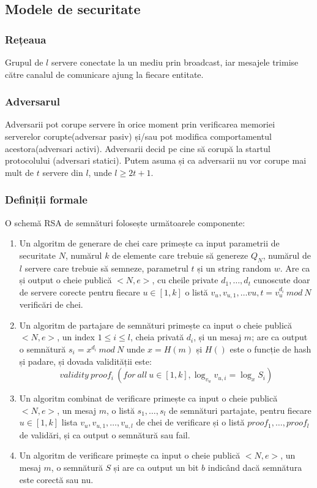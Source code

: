 \documentclass[12pt, oneside]{book}
\begin{document}
\subsection{Modele de securitate}
\subsubsection{Rețeaua}
Grupul de $l$ servere conectate la un mediu prin broadcast, iar mesajele trimise către canalul de comunicare ajung la fiecare entitate.
\subsubsection{Adversarul}
Adversarii pot corupe servere în orice moment prin verificarea memoriei serverelor corupte(adversar pasiv) și/sau pot modifica comportamentul acestora(adversari activi). Adversarii decid pe cine să corupă la startul protocolului (adversari statici). Putem asuma și ca adversarii nu vor corupe mai mult de $t$ servere din $l$, unde $l \geqslant 2t+1$.
\subsubsection{Definiții formale}
O schemă RSA de semnături folosește următoarele componente:
\begin{enumerate}
\item Un algoritm de generare de chei care primește ca input parametrii de securitate $N$, numărul $k$ de elemente care trebuie să genereze $Q_N$, numărul de $l$ servere care trebuie să semneze, parametrul $t$ și un string random $w$. Are ca și output o cheie publică $<N,e>$, cu cheile private $d_1, \dots ,d_t$ cunoscute doar de servere corecte pentru fiecare $u \in [1,k]$ o listă $v_u,v_{u,1}, \dots v{u,t}=v_{u}^{d_i} \ mod \ N$ verificări de chei. 
\item Un algoritm de partajare de semnături primește ca input o cheie publică $<N,e>$, un index $ 1\leq i \leq l$, cheia privată $d_i$, și un mesaj $m$; are ca output o semnătură $s_i = x^{d_i} \ mod \ N$ unde $x=H(m)$ și $H()$ este o funcție de hash și padare, și dovada validității este:
$$ validity \ proof_i \ (for \ all \ u \in [1,k], \log_{v_u} v_{u,i}=\log_x S_i)$$
\item Un algoritm combinat de verificare primește ca input o cheie publică $<N,e>$, un mesaj $m$, o listă $s_1, \dots ,s_l$ de semnături partajate, pentru fiecare $u \in [1,k]$ lista $v_u,v_{u,1}, \dots ,v_{u,l}$ de chei de verificare și o listă $proof_1, \dots ,proof_l$ de validări, și ca output o semnătură sau fail.
\item Un algoritm de verificare primește ca input o cheie publică $<N,e>$, un mesaj $m$, o semnătură $S$ și are ca output un bit $b$ indicând dacă semnătura este corectă sau nu.
\end{enumerate}
\end{document}
